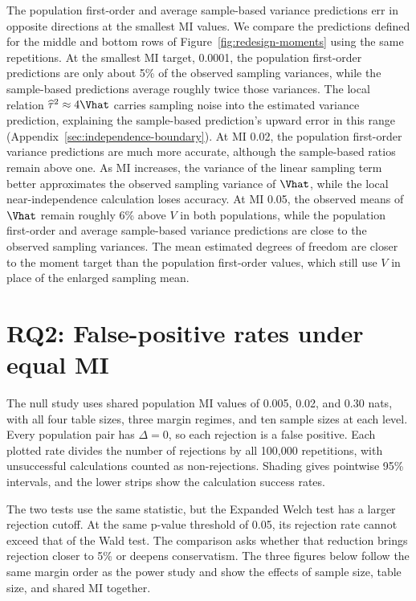 The population first-order and average sample-based variance predictions
err in opposite directions at the smallest MI values. We compare the
predictions defined for the middle and bottom rows of
Figure~\ref{fig:redesign-moments} using the same repetitions. At the smallest MI target,
0.0001, the population first-order predictions are only about
5\% of the observed sampling variances, while the sample-based predictions
average roughly twice those variances. The local relation
\(\widehat\tau^2\approx4\Vhat\) carries sampling noise into the estimated
variance prediction, explaining the sample-based prediction's upward error
in this range
(Appendix~\ref{sec:independence-boundary}). At MI 0.02, the population
first-order variance predictions are much more accurate, although the
sample-based ratios remain above one. As MI increases, the variance of the
linear sampling term better approximates the observed sampling variance of
\(\Vhat\), while the local near-independence calculation loses accuracy.
At MI 0.05, the observed means of \(\Vhat\) remain roughly 6\% above \(V\)
in both populations, while the population first-order and average
sample-based variance predictions are close to the observed sampling
variances. The mean estimated degrees of
freedom are closer to the moment target than the population first-order
values, which still use \(V\) in place of the enlarged sampling mean.

\section{RQ2: False-positive rates under equal MI}
\label{sec:null-rejection-patterns}

The null study uses shared population MI values of 0.005, 0.02, and 0.30
nats, with all four table sizes, three margin regimes, and ten sample
sizes at each level. Every population pair has \(\Delta=0\), so each
rejection is a false positive. Each plotted rate divides the number of
rejections by all 100,000 repetitions, with unsuccessful calculations
counted as non-rejections.
Shading gives pointwise 95\% intervals, and the lower strips show the
calculation success rates.

The two tests use the same statistic, but the Expanded Welch test has a larger
rejection cutoff. At the same p-value threshold of 0.05, its rejection rate
cannot exceed that of the Wald test. The comparison asks whether that
reduction brings rejection closer to 5\% or deepens conservatism. The
three figures below follow the same margin order as the power study and
show the effects of sample size, table size, and shared MI together.


